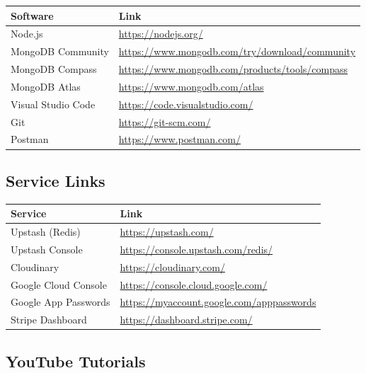 \documentclass[12pt,a4paper]{article}
\begin{document}
\begin{longtable}{p{4cm} p{8cm}}
    \toprule
    \textbf{Software} & \textbf{Link} \\
    \midrule
    Node.js & \url{https://nodejs.org/} \\
    MongoDB Community & \url{https://www.mongodb.com/try/download/community} \\
    MongoDB Compass & \url{https://www.mongodb.com/products/tools/compass} \\
    MongoDB Atlas & \url{https://www.mongodb.com/atlas} \\
    Visual Studio Code & \url{https://code.visualstudio.com/} \\
    Git & \url{https://git-scm.com/} \\
    Postman & \url{https://www.postman.com/} \\
    \bottomrule
\end{longtable}

\subsection{Service Links}

\begin{longtable}{p{4cm} p{8cm}}
    \toprule
    \textbf{Service} & \textbf{Link} \\
    \midrule
    Upstash (Redis) & \url{https://upstash.com/} \\
    Upstash Console & \url{https://console.upstash.com/redis/} \\
    Cloudinary & \url{https://cloudinary.com/} \\
    Google Cloud Console & \url{https://console.cloud.google.com/} \\
    Google App Passwords & \url{https://myaccount.google.com/apppasswords} \\
    Stripe Dashboard & \url{https://dashboard.stripe.com/} \\
    \bottomrule
\end{longtable}

\subsection{YouTube Tutorials}
\end{document}
